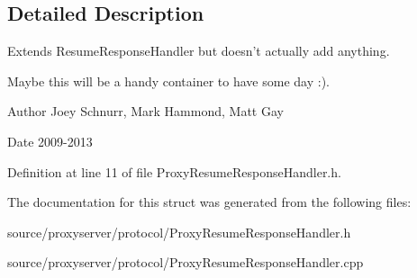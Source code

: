 \subsection{Detailed Description}
Extends Resume\-Response\-Handler but doesn't actually add anything. 

Maybe this will be a handy container to have some day \-:). \begin{DoxyAuthor}{Author}
Joey Schnurr, Mark Hammond, Matt Gay 
\end{DoxyAuthor}
\begin{DoxyDate}{Date}
2009-\/2013 
\end{DoxyDate}


Definition at line 11 of file Proxy\-Resume\-Response\-Handler.\-h.



The documentation for this struct was generated from the following files\-:\begin{DoxyCompactItemize}
\item 
source/proxyserver/protocol/Proxy\-Resume\-Response\-Handler.\-h\item 
source/proxyserver/protocol/Proxy\-Resume\-Response\-Handler.\-cpp\end{DoxyCompactItemize}
